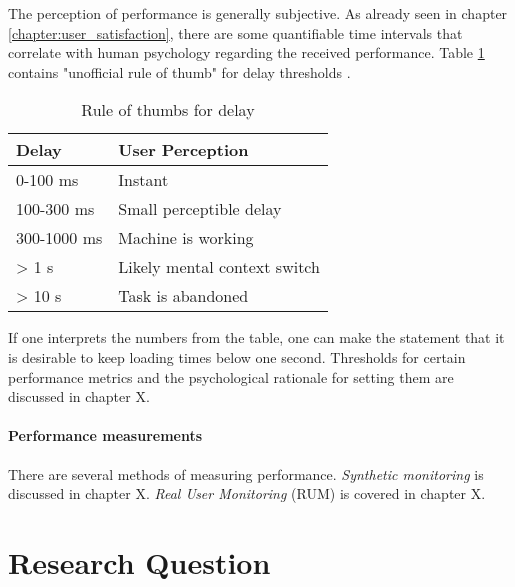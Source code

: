 The perception of performance is generally subjective.
As already seen in chapter \ref{chapter:user_satisfaction}, there are some quantifiable time intervals that correlate with human psychology regarding the received performance.
Table \ref{table:perception} contains "unofficial rule of thumb" for delay thresholds \cite{2013Grigorik}.


\begin{table}[h]
	\centering
	\begin{tabular}{| l | l | }
	\hline
	Delay & User Perception \\
	\hline
	0-100 ms & Instant \\
	100-300 ms & Small perceptible delay \\
	300-1000 ms & Machine is working \\
	> 1 s & Likely mental context switch \\
	> 10 s & Task is abandoned \\
	\hline
	\end{tabular}
	\label{table:perception}
	\caption{Rule of thumbs for delay}
\end{table}

If one interprets the numbers from the table, one can make the statement that it is desirable to keep loading times below one second.
Thresholds for certain performance metrics and the psychological rationale for setting them are discussed in chapter X. %





\paragraph{Performance measurements}

There are several methods of measuring performance.
\textit{Synthetic monitoring }is discussed in chapter X.
\textit{Real User Monitoring} (RUM) is covered in chapter X.







\section{Research Question}
\label{chapter:research_question}

